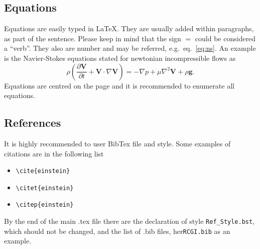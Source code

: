 \subsection{Equations}

Equations are easily typed in \LaTeX. They are usually added within paragraphs, as part of the sentence. Please keep in mind that the sign $=$ could be considered a ``verb''. They also are number and may be referred, e.g.\ eq.~\ref{eq:ns}. An example is the Navier-Stokes equations stated for newtonian incompressible flows as
\begin{equation}
   \rho \left( \frac{\partial \boldsymbol{V}}{\partial t} + \boldsymbol{V}\cdot \nabla \boldsymbol{V} \right) = -\nabla p + \mu \nabla^2 \boldsymbol{V} + \rho \boldsymbol{g}. \label{eq:ns}
\end{equation}
Equations are centred on the page and it is recommended to enumerate all equations.



\subsection{References}

It is highly recommended to user BibTex file and style. Some examples of citations are in the following list 
\begin{itemize}
    \item \verb+\cite{einstein}+ \cite{einstein}
    \item  \verb+\citet{einstein}+ \citet{einstein}
    \item \verb+\citep{einstein}+ \citep{einstein}
\end{itemize}

By the end of the main .tex file there are the declaration of style \verb+Ref_Style.bst+, which should not be changed, and the list of .bib files, her\verb+RCGI.bib+ as an example.